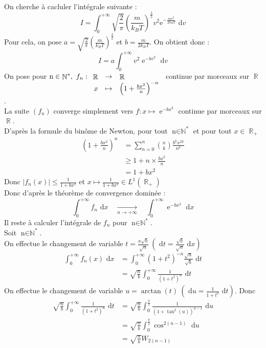 \documentclass{article}
\newcommand{\dint}[1]{\text{ d}#1}
\newcommand{\toinf}[1]{\underset{#1\to+\infty}{\longrightarrow}}
\DeclareMathOperator{\e}{\mathrm{e}}
\DeclareMathOperator{\R}{\mathbb{R}}
\DeclareMathOperator{\N}{\mathbb{N}}
\DeclareMathOperator{\n}{n\in\N}
\begin{document}
\noindent On cherche à cacluler l'intégrale suivante :
\[ I = \int_0^{+\infty}\sqrt{\frac{2}{\pi}}\left(\frac{m}{k_BT}\right)^\frac{3}{2}v^2\mathrm{e}^{-\frac{mv^2}{2k_BT}}\dint{v} \]
Pour cela, on pose $\displaystyle a=\sqrt{\frac{2}{\pi}}\left(\frac{m}{k_BT}\right)^\frac{3}{2}$ et $\displaystyle b=\frac{m}{2k_BT}$. On obtient donc :
\[ I = a\int_0^{+\infty}v^2\e^{-bv^2}\dint{v} \]
On pose pour $\n^*,\ f_n:\begin{array}[t]{rcl}
    \R&\to&\R\\x&\mapsto&\left(1+\frac{bx^2}{n}\right)^{-n}
\end{array}$ continue par morceaux sur $\R$. \\
La suite $(f_n)$ converge simplement vers $f:x\mapsto\e^{-bx^2}$ continue par morceaux sur $\R$. \\
D'après la formule du binôme de Newton, pour tout $\n^*$ et pour tout $x\in\R_+$
\begin{align*}
    \left(1+\frac{bx^2}{n}\right)^n &= \sum_{n=0}^n\binom{n}{k}\frac{b^kx^{2k}}{n^k} \\
    &\geqslant 1 + n\times\frac{bx^2}{n} \\
    &= 1 + bx^2
\end{align*}
Donc $\displaystyle|f_n(x)|\leqslant\frac{1}{1+bx^2}$ et $\displaystyle x\mapsto\frac{1}{1+bx^2}\in L^1(\R_+)$ \\
Donc d'après le théorème de convergence dominée :
\[ \int_0^{+\infty}f_n\dint{x}\quad\toinf{n}\quad\int_0^{+\infty}\e^{-bx^2}\dint{x} \]
Il reste à calculer l'intégrale de $f_n$ pour $\n^*$. \\
Soit $\n^*$. \\
On effectue le changement de variable $\displaystyle t=\frac{x\sqrt{b}}{\sqrt{n}}\ \left(\dint{t}=\frac{\sqrt{b}}{\sqrt{n}}\dint{x}\right)$
\begin{align*}
    \int_0^{+\infty}f_n(x)\dint{x} &= \int_0^{+\infty}(1+t^2)^{-n}\frac{\sqrt{n}}{\sqrt{b}}\dint{t} \\
    &= \sqrt{\frac{n}{b}}\int_0^{+\infty}\frac{1}{(1+t^2)^n}\dint{t}
\end{align*}
On effectue le changement de variable $\displaystyle u=\arctan(t)\ \left(\dint{u}=\frac{1}{1+t^2}\dint{t}\right)$. Donc
\begin{align*}
    \sqrt{\frac{n}{b}}\int_0^{+\infty}\frac{1}{(1+t^2)^n}\dint{t} &= \sqrt{\frac{n}{b}}\int_0^{\frac{\pi}{2}}\frac{1}{(1+\tan^2(u))^{n-1}}\dint{u} \\
    &= \sqrt{\frac{n}{b}}\int_0^{\frac{\pi}{2}}\cos^{2(n-1)}\dint{u} \\
    &= \sqrt{\frac{n}{b}}W_{2(n-1)}
\end{align*}
\end{document}
